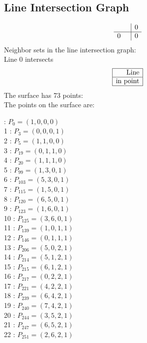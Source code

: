 \documentclass{article}
\begin{document}
{\subsection*{Line Intersection Graph}
{\arraycolsep=1pt
$$
\begin{array}{rr|*{1}r}
 &  & 0\\
\hline
0 &  & 0\\
\end{array}
$$
}%
Neighbor sets in the line intersection graph:\\
Line 0 intersects 
$$
\begin{array}{|r*{0}{|c}|}
\hline
\mbox{Line} \\
\hline
\mbox{in point} \\
\hline
\end{array}
$$
The surface has 73 points:\\
The points on the surface are:\\
\begin{multicols}{3}
 : $P_{0}=( 1, 0, 0, 0 )$\\
1 : $P_{3}=( 0, 0, 0, 1 )$\\
2 : $P_{5}=( 1, 1, 0, 0 )$\\
3 : $P_{19}=( 0, 1, 1, 0 )$\\
4 : $P_{20}=( 1, 1, 1, 0 )$\\
5 : $P_{99}=( 1, 3, 0, 1 )$\\
6 : $P_{103}=( 5, 3, 0, 1 )$\\
7 : $P_{115}=( 1, 5, 0, 1 )$\\
8 : $P_{120}=( 6, 5, 0, 1 )$\\
9 : $P_{123}=( 1, 6, 0, 1 )$\\
10 : $P_{125}=( 3, 6, 0, 1 )$\\
11 : $P_{139}=( 1, 0, 1, 1 )$\\
12 : $P_{146}=( 0, 1, 1, 1 )$\\
13 : $P_{206}=( 5, 0, 2, 1 )$\\
14 : $P_{214}=( 5, 1, 2, 1 )$\\
15 : $P_{215}=( 6, 1, 2, 1 )$\\
16 : $P_{217}=( 0, 2, 2, 1 )$\\
17 : $P_{221}=( 4, 2, 2, 1 )$\\
18 : $P_{239}=( 6, 4, 2, 1 )$\\
19 : $P_{240}=( 7, 4, 2, 1 )$\\
20 : $P_{244}=( 3, 5, 2, 1 )$\\
21 : $P_{247}=( 6, 5, 2, 1 )$\\
22 : $P_{251}=( 2, 6, 2, 1 )$\\

\end{multicols}}
\end{document}
